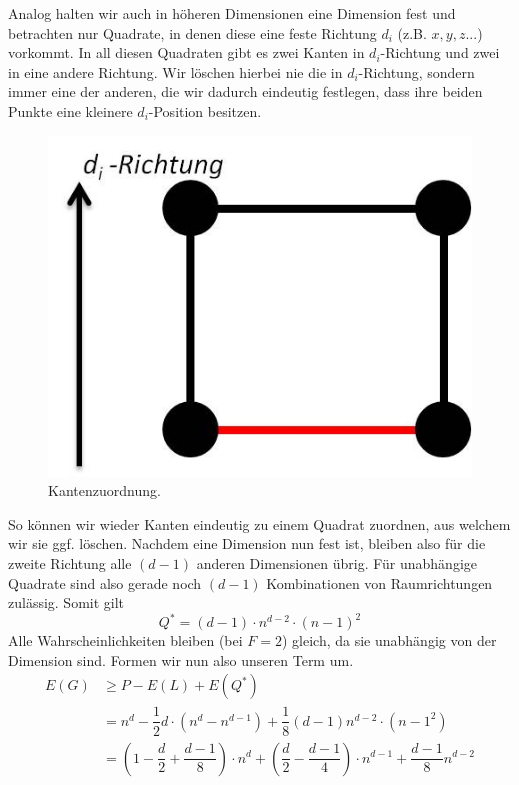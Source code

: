 \documentclass[11pt,a4paper]{article}
\numberwithin{equation}{section}
\numberwithin{table}{section}
\numberwithin{figure}{section}
\begin{document}
Analog halten wir auch in höheren Dimensionen eine Dimension fest und betrachten nur Quadrate, in denen diese eine feste Richtung $d_i$ (z.B. $x,y,z ...$) vorkommt. In all diesen Quadraten gibt es zwei Kanten in $d_i$-Richtung und zwei in eine andere Richtung. Wir löschen hierbei nie die in $d_i$-Richtung, sondern immer eine der anderen, die wir dadurch eindeutig festlegen, dass ihre beiden Punkte eine kleinere $d_i$-Position besitzen.
\begin{center}
\begin{figure}[H]\label{dimens}
\begin{center}\includegraphics[scale=0.7]{Kante}
\caption{Kantenzuordnung.}\end{center}
\end{figure}
\end{center}So können wir wieder Kanten eindeutig zu einem Quadrat zuordnen, aus welchem wir sie ggf. löschen. Nachdem eine Dimension nun fest ist, bleiben also für die zweite Richtung alle $(d-1)$ anderen Dimensionen übrig. Für unabhängige Quadrate sind also gerade noch $(d-1)$ Kombinationen von Raumrichtungen zulässig. Somit gilt $$Q^*=(d-1)\cdot n^{d-2}\cdot(n-1)^{2}$$
Alle Wahrscheinlichkeiten bleiben (bei $F=2$) gleich, da sie unabhängig von der Dimension sind.
Formen wir nun also unseren Term um.
\begin{align*}
  E(G)&\geq P-E(L)+E(Q^*)\\
  &=n^{d}-\dfrac{1}{2}d\cdot(n^{d}-n^{d-1})+\dfrac{1}{8}(d-1)n^{d-2}\cdot(n-1^{2})\\
&=\left(1-\dfrac{d}{2}+\dfrac{d-1}{8}\right)\cdot n^d+\left(\dfrac{d}{2}-\dfrac{d-1}{4}\right)\cdot n^{d-1}+\dfrac{d-1}{8}n^{d-2}
\end{align*}
\end{document}

